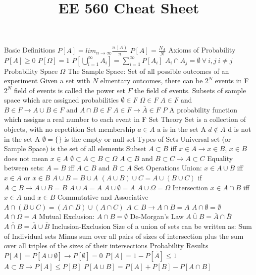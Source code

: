 \documentclass[14pt]{extarticle}
\title{EE 560 Cheat Sheet}
\begin{document}
	\maketitle
	
	\begin{outline}		
		\1	Basic Definitions
			\2	$P[A] = lim_{n \rightarrow \infty} \frac{n(A)}{n}$
			\2	$P[A] = \frac{N_A}{N}$
			\2	Axioms of Probability
				\3	$P[A] \ge 0$
				\3	$P[\Omega] = 1$
				\3	$P[\bigcup_{i=1}^{\infty} A_i] = \sum_{i=1}^{\infty} P[A_i]$
					\4	$A_i \cap A_j = \emptyset~\forall~i,j~i \ne j$
			\2	Probability Space
				\3	$\Omega$ The Sample Space:	Set of all possible outcomes of an experiment
					\4	Given a set with $N$ elmentary outcomes, there can be $2^N$ events in F
					\4	$2^N$ field of events is called the power set
				\3	$F$ the field of events.  Subsets of sample space which are assigned probabilities
					\4	$\emptyset \in F$
					\4	$\Omega \in F$
					\4	$A \in F$ and $B \in F \rightarrow A\cup B \in F$ and $A \cap B \in F$
					\4	$A \in F \rightarrow \bar{A} \in F$
				\3	$P$ A probability function which assigns a real number to each event in F
		\1	Set Theory
			\2	Set is a collection of objects, with no repetition
			\2	Set membership
				\3	$a \in A$ a is in the set A
				\3	$d \notin A$ d is not in the set A
				\3	$\emptyset = \{\}$ is the empty or null set
			\2	Types of Sets
				\3	Universal set (or Sample Space) is the set of all elements
				\3	Subset
					\4	$A \subset B$ iff $x \in A \rightarrow x \in B$, $x \in B$ does not mean $x \in A$
					\4	$\emptyset \subset A \subset B \subset \Omega$
					\4	$A \subset B$ and $B \subset C \rightarrow A \subset C$
				\3	Equality between sets: $A = B$ iff $A \subset B$ and $B \subset A$
			\2	Set Operations
				\3	Union:	$x \in A \cup B$ iff $x \in A$ or $x \in B$
					\4	$A \cup B = B \cup A$
					\4	$(A \cup B) \cup C = A \cup (B \cup C)$
					\4	if $A \subset B \rightarrow A \cup B = B$
					\4	$A \cup A = A$
					\4	$A \cup \emptyset = A$
					\4	$A \cup \Omega = \Omega$
				\3	Intersection
					\4	$x \in A \cap B$ iff $x \in A$ and $x \in B$
					\4	Commutative and Associative
					\4	$A \cap (B \cup C) = (A \cap B) \cup (A \cap C)$
					\4	$A \subset B \rightarrow A \cap B = A$
					\4	$A \cap \emptyset = \emptyset$
					\4	$A \cap \Omega = A$
			\2	Mutual Exclusion: $A \cap B = \emptyset$
			\2	De-Morgan's Law
				\3	$\bar{A \cup B} = \bar{A} \cap \bar{B}$
				\3	$\bar{A \cap B} = \bar{A} \cup \bar{B}$
			\2	Inclusion-Exclusion
				\3	Size of a union of sets can be written as:
					\4	Sum of Individual sets
					\4	Minus sum over all pairs of sizes of intersection
					\4	plus the sum over all triples of the sizes of their intersections
			\2	Probability Results
				\3	$P[A] = P[A \cup \emptyset] \rightarrow P[\emptyset] = 0$
				\3	$P[A] = 1 - P[\bar{A}] \le 1$
				\3	$A \subset B \rightarrow P[A] \le P[B]$
				\3	$P[A \cup B] = P[A] + P[B] - P[A \cap B]$

	\end{outline}
\end{document}
